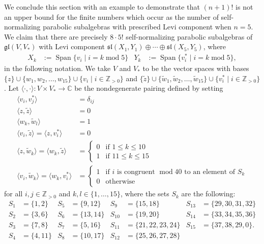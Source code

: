 \documentclass{amsart}
\theoremstyle{definition}
\theoremstyle{remark}
\numberwithin{equation}{section}
\newcommand {\Z} {\mathbb{Z}}
\newcommand {\C} {\mathbb{C}}
\def\gl{\mathfrak {gl}}
\def\sl{\mathfrak{sl}}
\newcommand {\Span}{\operatorname{Span}}
\begin{document}
We conclude this section with an example to demonstrate that $(n+1)!$ is not an upper bound for the finite numbers which occur as the number of self-normalizing parabolic subalgebras with prescribed Levi component when $n=5$.
We claim that there are precisely $8 \cdot 5!$ self-normalizing parabolic subalgebras of $\gl(V,V_*)$ with Levi component  $\sl(X_1,Y_1) \oplus \cdots \oplus \sl(X_5,Y_5)$, where  
\begin{align*}
X_k & := \Span \{ v_i \mid i = k \operatorname{mod} 5 \} & Y_k & := \Span \{ v_i^* \mid i = k \operatorname{mod} 5 \},
\end{align*}
in the following notation.   We take $V$ and $V_*$ to be the vector spaces with bases $\{z\} \cup \{w_1, w_2, \ldots, w_{15} \} \cup \{ v_i \mid i \in \Z_{>0} \}$ and $\{ \tilde{z} \} \cup \{ \tilde{w}_1, \tilde{w}_2, \ldots, \tilde{w}_{15}  \} \cup \{ v_i^* \mid i \in \Z_{>0} \}$.  
Let $\langle \cdot , \cdot \rangle : V \times V_* \rightarrow \C$ be the nondegenerate pairing defined by setting
\begin{align*}
\langle v_i , v_j^* \rangle & = \delta_{ij} \\
\langle z , \tilde{z} \rangle & = 0 \\
\langle w_k , \tilde{w}_l \rangle & = 1 \\
\langle v_i, \tilde{z} \rangle = \langle z , v_i^* \rangle & = 0 \\
\langle z , \tilde{w}_k \rangle = \langle w_k , \tilde{z} \rangle & =
\begin{cases}
0 & \textrm{if } 1 \leq k \leq 10 \\
1 & \textrm{if } 11 \leq k \leq 15
\end{cases} \\
\langle v_i, \tilde{w}_k \rangle = \langle w_k , v_i^* \rangle & = 
\begin{cases}
1 & \textrm{if } i \textrm{ is congruent $\operatorname{mod} 40$ to an element of } S_k \\
0 & \textrm{otherwise}
\end{cases}
\end{align*}
for all $i, j \in \Z_{>0}$ and $k, l \in \{1, \ldots, 15 \}$, 
where the sets $S_k$ are the following:
\begin{align*}
S_1 & = \{1,2\} &
S_5 & = \{9, 12\} &
S_9 & = \{ 15, 18 \} & 
S_{13} &= \{29,30,31,32 \} \\
S_2 & = \{3,6\} & 
S_6 & = \{13,14\} &
S_{10} & = \{19, 20\} &
S_{14} & = \{33,34,35,36 \} \\
S_3 & = \{7,8\} & 
S_7 & = \{5, 16\} & 
S_{11} &= \{21,22,23,24 \} &
S_{15} & = \{37,38,29,0 \}. \\
S_4 & = \{ 4, 11\} &
S_8 & = \{10,17\} &
S_{12} &= \{25,26,27,28 \} &&
\end{align*}
 
\end{document}
